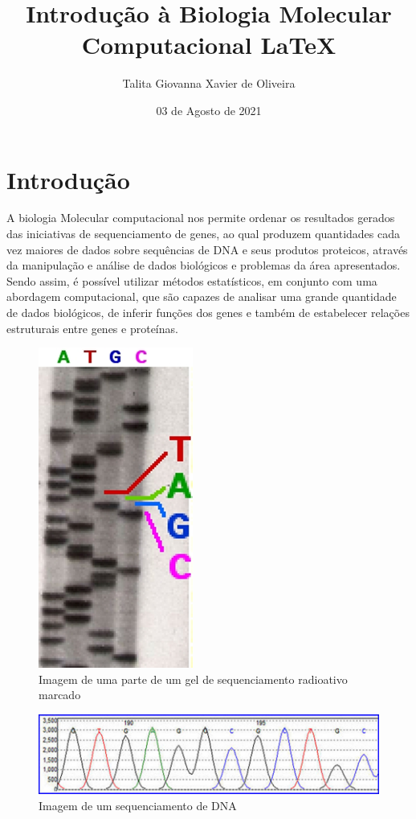 \documentclass{article}
\title{Introdução à Biologia Molecular Computacional \LaTeX}
\author{Talita Giovanna Xavier de Oliveira}
\date{03 de Agosto de 2021}
\begin{document}
\maketitle

\section{Introdução}
\par 
A biologia Molecular computacional nos permite ordenar os resultados gerados das iniciativas de sequenciamento de genes, ao qual produzem quantidades cada vez maiores de dados sobre sequências de DNA e seus produtos proteicos, através da manipulação e análise de dados biológicos e problemas da área apresentados. Sendo assim, é possível utilizar métodos estatísticos, em conjunto com uma abordagem computacional, que são capazes de analisar uma grande quantidade de dados biológicos, de inferir funções dos genes e também de estabelecer relações estruturais entre genes e proteínas\cite{araujo}.
\begin{figure}[ht]
    \centering
    \includegraphics[scale= 0.2]{DNA seq.png}
    \caption{Imagem de uma parte de um gel de sequenciamento radioativo marcado\cite{biologia}}
    \label{imagem_um}
\end{figure}
\begin{figure}[ht]
    \centering
    \includegraphics[scale= 0.2]{DNA sequenciamento.png}
    \caption{Imagem de um sequenciamento de DNA\cite{biologia}}
    \label{imagem_dois}
\end{figure}
\end{document}
